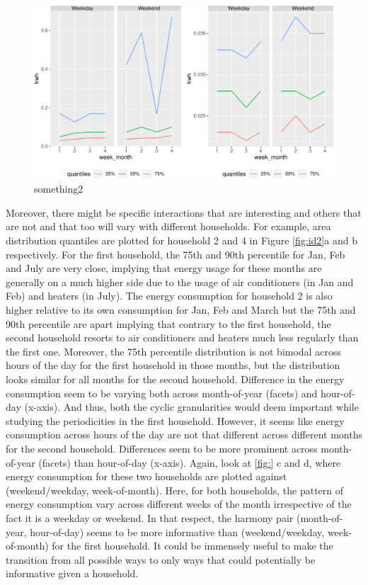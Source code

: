 \documentclass[
]{article}
\begin{document}
\begin{figure}

{\centering \includegraphics[width=\textwidth]{figure/id4-1} 

}

\caption{something2}\label{fig:id4}
\end{figure}

Moreover, there might be specific interactions that are interesting and others that are not and that too will vary with different households. For example, area distribution quantiles are plotted for household 2 and 4 in Figure \ref{fig:id2}a and b respectively. For the first household, the 75th and 90th percentile for Jan, Feb and July are very close, implying that energy usage for these months are generally on a much higher side due to the usage of air conditioners (in Jan and Feb) and heaters (in July). The energy consumption for household 2 is also higher relative to its own consumption for Jan, Feb and March but the 75th and 90th percentile are apart implying that contrary to the first household, the second household resorts to air conditioners and heaters much less regularly than the first one. Moreover, the 75th percentile distribution is not bimodal across hours of the day for the first household in those months, but the distribution looks similar for all months for the second household. Difference in the energy consumption seem to be varying both across month-of-year (facets) and hour-of-day (x-axis). And thus, both the cyclic granularities would deem important while studying the periodicities in the first household. However, it seems like energy consumption across hours of the day are not that different across different months for the second household. Differences seem to be more prominent across month-of-year (facets) than hour-of-day (x-axis). Again, look at \ref{fig:} c and d, where energy consumption for these two households are plotted against (weekend/weekday, week-of-month). Here, for both households, the pattern of energy consumption vary across different weeks of the month irrespective of the fact it is a weekday or weekend. In that respect, the harmony pair (month-of-year, hour-of-day) seems to be more informative than (weekend/weekday, week-of-month) for the first household. It could be immensely useful to make the transition from all possible ways to only ways that could potentially be informative given a household.
\end{document}
